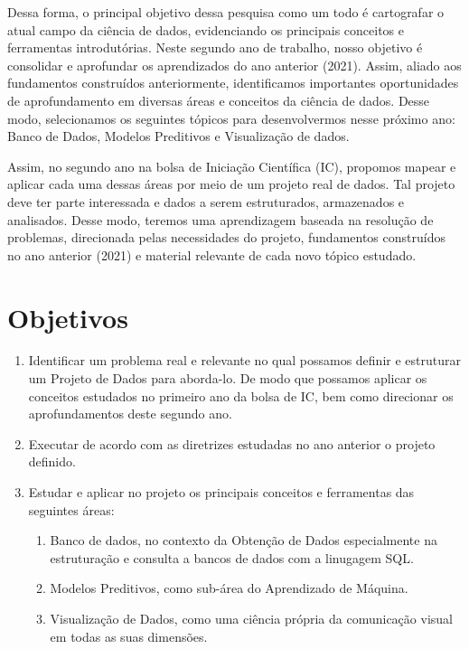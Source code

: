 \documentclass{article}
\begin{document}
Dessa forma, o principal objetivo dessa pesquisa como um todo é cartografar o atual campo da ciência de dados, evidenciando os principais conceitos e ferramentas introdutórias.
Neste segundo ano de trabalho, nosso objetivo é consolidar e aprofundar os aprendizados do ano anterior (2021). Assim, aliado aos fundamentos construídos anteriormente, identificamos importantes oportunidades de aprofundamento em diversas áreas e conceitos da ciência de dados. Desse modo, selecionamos os seguintes tópicos para desenvolvermos nesse próximo ano: Banco de Dados, Modelos Preditivos e Visualização de dados.

Assim, no segundo ano na bolsa de Iniciação Científica (IC), propomos mapear e aplicar cada uma dessas áreas por meio de um projeto real de dados. Tal projeto deve ter parte interessada e dados a serem estruturados, armazenados e analisados. 
Desse modo, teremos uma aprendizagem baseada na resolução de problemas, direcionada pelas necessidades do projeto, fundamentos construídos no ano anterior (2021) e material relevante de cada novo tópico estudado. 

\section{Objetivos}
\begin{enumerate}
    \item Identificar um problema real e relevante no qual possamos definir e estruturar um Projeto de Dados para aborda-lo. De modo que possamos aplicar os conceitos estudados no primeiro ano da bolsa de IC, bem como direcionar os aprofundamentos deste segundo ano.
    \item Executar de acordo com as diretrizes estudadas no ano anterior o projeto definido.
    \item Estudar e aplicar no projeto os principais conceitos e ferramentas das seguintes áreas:
    \begin{enumerate}
        \item Banco de dados, no contexto da Obtenção de Dados especialmente na estruturação e consulta a bancos de dados com a linugagem SQL. 
        \item Modelos Preditivos, como sub-área do Aprendizado de Máquina.
        \item Visualização de Dados, como uma ciência própria da comunicação visual em todas as suas dimensões. 
    \end{enumerate}
\end{enumerate}
\end{document}
